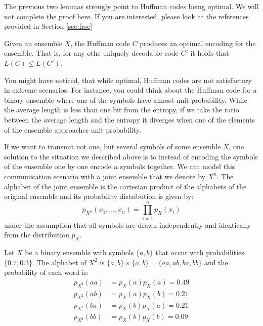 The previous two lemmas strongly point to Huffman codes being optimal. We will not complete the proof here. If you are interested, please look at the references provided in Section \ref{sec:frsc}
\begin{theorem}
Given an ensemble $X$, the Huffman code $C$ produces an optimal encoding for the ensemble. That is, for any othe uniquely decodable code $C'$ it holds that $L(C)\leq L(C')$.
\end{theorem}
You might have noticed, that while optimal, Huffman codes are not satisfactory in extreme scenarios. 
For instance, you could think about the Huffman code for a binary ensemble where one of the symbols have almost unit probability. 
While the average length is less than one bit from the entropy, if we take the ratio between the average length and the entropy it diverges when one of the elements of the ensemble approaches unit probability. 

If we want to transmit not one, but several symbols of some ensemble $X$, one solution to the situation we described above is to instead of encoding the symbols of the ensemble one by one encode $n$ symbols together. We can model this communication scenario with a joint ensemble that we denote by $X^n$. The alphabet of the joint ensemble is the cartesian product of the alphabets of the original ensemble and its probability distribution is given by:
\begin{equation}
p_{X^n}(x_1,\ldots,x_n)=\prod_{i=1}^np_X(x_i)
\end{equation}
under the assumption that all symbols are drawn independently and identically from the distribution $p_X$.
\begin{example}
Let $X$ be a binary ensemble with symbols $\{a,b\}$ that occur with probabilities $\{0.7,0.3\}$. The alphabet of $X^2$ is $\{a,b\}\times\{a,b\}=\{aa,ab,ba,bb\}$ and the probability of each word is:
\begin{align}
p_{X^2}(aa)&=p_X(a)p_X(a)=0.49\\
p_{X^2}(ab)&=p_X(a)p_X(b)=0.21\\
p_{X^2}(ba)&=p_X(b)p_X(a)=0.21\\
p_{X^2}(bb)&=p_X(b)p_X(b)=0.09
\end{align}
\end{example}

